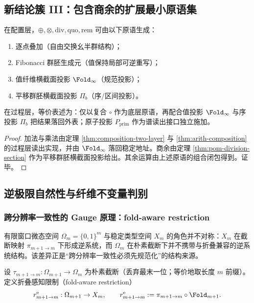 \subsection{新结论簇 III：包含商余的扩展最小原语集}\label{subsec:pom-primitive-extended}
\begin{theorem}[扩展最小原语集]\label{thm:pom-extended-primitives}
在配置层，$\oplus,\otimes,\mathrm{div},\mathrm{quo},\mathrm{rem}$ 可由以下原语生成：
\begin{enumerate}
  \item 逐点叠加（自由交换幺半群结构）；
  \item Fibonacci 群胚生成元（值保持局部可逆重写）；
  \item 值纤维横截面投影 $\Fold_\infty$（规范投影）；
  \item 平移群胚横截面投影 $\Pi_b$（序/区间投影）。
\end{enumerate}
在过程层，等价表述为：仅以复合 $\circ$ 作为底层原语，再配合值投影 $\Fold_\infty$ 与序投影 $\Pi_b$ 把结果落回外表；原子投影 $P_{\mathrm{prim}}$ 作为谱读出接口独立施加。
\end{theorem}
\begin{proof}
加法与乘法由定理 \ref{thm:composition-two-layer} 与 \ref{thm:arith-composition} 的过程层读出实现，并由 $\Fold_\infty$ 落回稳定地址。商余由定理 \ref{thm:pom-division-section} 作为平移群胚横截面投影给出。其余运算由上述原语的组合闭包得到。证毕。
\end{proof}

\subsection{逆极限自然性与纤维不变量判别}\label{subsec:pom-new-results}
\subsubsection{跨分辨率一致性的 Gauge 原理：fold-aware restriction}\label{subsubsec:pom-gauge}
有限窗口微态空间 $\Omega_m=\{0,1\}^m$ 与稳定类型空间 $X_m$ 的角色并不对称：$X_m$ 在截断映射 $\pi_{m+1\to m}$ 下形成逆系统，而 $\Omega_m$ 在朴素截断下并不携带与折叠兼容的逆系统结构。该差异正是“跨分辨率一致性必须先规范化”的结构来源。

\begin{definition}[朴素截断与折叠感知限制]\label{def:pom-fold-aware-restriction}
设 $\tau_{m+1\to m}:\Omega_{m+1}\to\Omega_m$ 为朴素截断（丢弃最末一位；等价地取长度 $m$ 前缀）。定义折叠感知限制（fold-aware restriction）
$$
r^{\mathrm{e}}_{m+1\to m}:\Omega_{m+1}\to X_m,
\qquad
r^{\mathrm{e}}_{m+1\to m}:=\pi_{m+1\to m}\circ\Fold_{m+1}.
$$
\end{definition}

